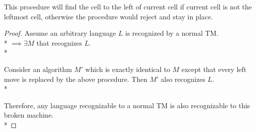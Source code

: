 \documentclass{article}
\begin{document}
This procedure will find the cell to the left of current cell if current cell is not the leftmost cell, otherwise the procedure would reject and stay in place.

\begin{proof}
    Assume an arbitrary language $L$ is recognized by a normal TM.\\*
    $\implies \exists M$ that recognizes $L$. \\*

    Consider an algorithm $M'$ which is exactly identical to $M$ except that every left move is replaced by 
    the above procedure. Then $M'$ also recognizes $L$.\\*

    Therefore, any language recognizable to a normal TM is also recognizable to this broken machine.\\*
\end{proof}
\end{document}
